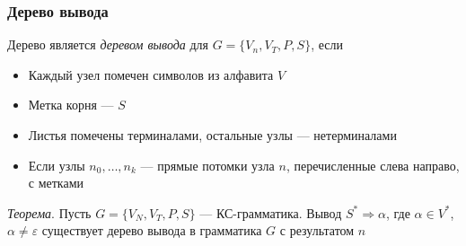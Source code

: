\documentclass[a4paper, 14pt]{extarticle}
\begin{document}
\subsubsection*{Дерево вывода}
Дерево является \textit{деревом вывода} для $G = \{ V_n, V_T, P, S \} $, если
\begin{itemize}
    \item Каждый узел помечен символов из алфавита $V$
    \item Метка корня --- $S$
    \item Листья помечены терминалами, остальные узлы --- нетерминалами
    \item Если узлы $n_0, \ldots, n_k$ --- прямые потомки узла $n$, перечисленные слева направо, с метками
\end{itemize}

\textit{Теорема}. Пусть $G = \{V_N, V_T, P, S\}$ --- КС-грамматика. Вывод $S^* \Rightarrow \alpha$, где $\alpha \in V^*$, $\alpha \ne \varepsilon$ существует дерево вывода в грамматика $G$ с результатом $n$
\end{document}
